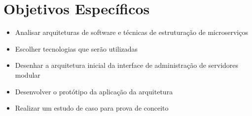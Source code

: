 \section{Objetivos Específicos}

  \begin{itemize}
    \item Analisar arquiteturas de software e técnicas de estruturação de microserviços
    \item Escolher tecnologias que serão utilizadas
    \item Desenhar a arquitetura inicial da interface de administração de servidores modular
    \item Desenvolver o protótipo da aplicação da arquitetura
    \item Realizar um estudo de caso para prova de conceito
  \end{itemize}
